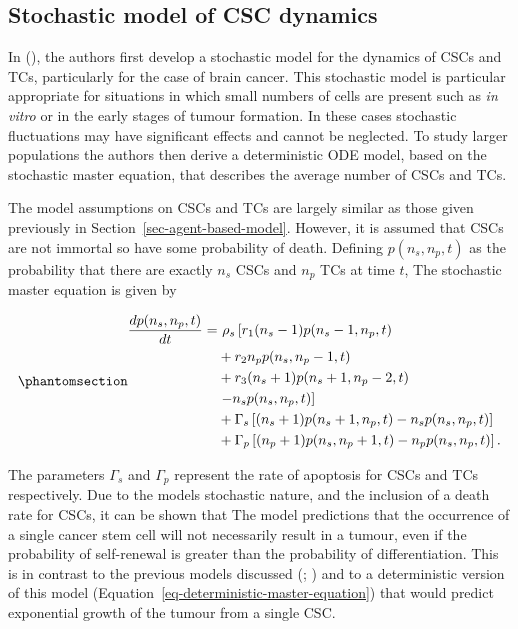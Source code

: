 \documentclass[
  letterpaper,
]{scrreprt}
\theoremstyle{definition}
\theoremstyle{remark}
\begin{document}
\subsection{Stochastic model of CSC
dynamics}\label{sec-stochastic-model}

In (), the authors first
develop a stochastic model for the dynamics of CSCs and TCs,
particularly for the case of brain cancer. This stochastic model is
particular appropriate for situations in which small numbers of cells
are present such as \emph{in vitro} or in the early stages of tumour
formation. In these cases stochastic fluctuations may have significant
effects and cannot be neglected. To study larger populations the authors
then derive a deterministic ODE model, based on the stochastic master
equation, that describes the average number of CSCs and TCs.

The model assumptions on CSCs and TCs are largely similar as those given
previously in Section~\ref{sec-agent-based-model}. However, it is
assumed that CSCs are not immortal so have some probability of death.
Defining \(p(n_s, n_p,t)\) as the probability that there are exactly
\(n_s\) CSCs and \(n_p\) TCs at time \(t\), The stochastic master
equation is given by

\begin{equation}\phantomsection\label{eq-stochastic-master-equation}{
\begin{aligned}
\frac{dp(n_s,n_p,t)}{dt} = & \ \rho_s \left[r_1 (n_s - 1) p(n_s - 1, n_p, t) \right. \\
& + r_2 n_p p(n_s, n_p - 1, t) \\
& + r_3 (n_s + 1) p(n_s + 1, n_p - 2, t) \\
& \left. - n_s p(n_s, n_p, t) \right] \\
& + \Gamma_s \left[ (n_s + 1) p(n_s + 1, n_p, t) - n_s p(n_s, n_p, t) \right] \\
& + \Gamma_p \left[ (n_p + 1) p(n_s, n_p + 1, t) - n_p p(n_s, n_p, t) \right].
\end{aligned}
}\end{equation}

The parameters \(\Gamma_s\) and \(\Gamma_p\) represent the rate of
apoptosis for CSCs and TCs respectively. Due to the models stochastic
nature, and the inclusion of a death rate for CSCs, it can be shown that
The model predictions that the occurrence of a single cancer stem cell
will not necessarily result in a tumour, even if the probability of
self-renewal is greater than the probability of differentiation. This is
in contrast to the previous models discussed
(;
) and to
a deterministic version of this model
(Equation~\ref{eq-deterministic-master-equation}) that would predict
exponential growth of the tumour from a single CSC.
\end{document}
